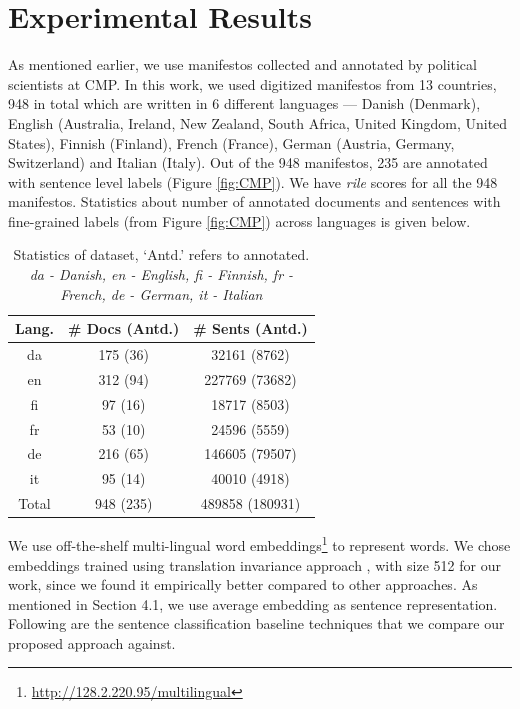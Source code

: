 \documentclass[11pt,a4paper]{article}
\begin{document}
\section{Experimental Results}
As mentioned earlier, we use manifestos collected and annotated by political scientists at CMP. In this work, we used digitized manifestos from 13 countries, 948 in total which are written in 6 different languages --- Danish (Denmark), English (Australia, Ireland, New Zealand, South Africa, United Kingdom, United States), Finnish (Finland), French (France), German (Austria, Germany, Switzerland) and Italian (Italy). Out of the 948 manifestos, 235 are annotated with sentence level labels (Figure \ref{fig:CMP}). We have \textit{rile} scores for all the 948 manifestos. Statistics about number of annotated documents and sentences with fine-grained labels (from Figure \ref{fig:CMP}) across languages is given below.
 \begin{table}[!ht]
  \centering
  \begin{tabular}{ c c c }
  \toprule
    Lang. & \# Docs (Antd.) & \# Sents (Antd.)\\
    \midrule
    da  & 175 (36)  &  32161 (8762)	\\
    en   &  312 (94)& 227769 (73682) 	 \\    	
    fi  &  97 (16) &  18717 (8503) \\
    fr    & 53 (10) & 24596 (5559)\\
    de    & 216 (65) & 146605 (79507) \\
    it    & 95 (14)  & 40010 (4918)\\
\midrule
 Total    & 948 (235)  & 489858 (180931)\\
    \bottomrule

  \end{tabular}
  \caption{Statistics of dataset, `Antd.' refers to annotated. \textit{da - Danish, en - English, fi - Finnish, fr - French, de - German, it - Italian}}
  \label{tab:al}
\end{table}

We use off-the-shelf multi-lingual word embeddings\footnote{\url{http://128.2.220.95/multilingual}} to represent words. We chose embeddings trained using translation invariance approach \cite{ammar2016massively}, with size 512 for our work, since we found it empirically better compared to other approaches. As mentioned in Section 4.1, we use average embedding as sentence representation. Following are the sentence classification baseline techniques that we compare our proposed approach against.
\end{document}
